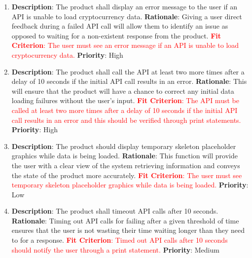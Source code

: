 \documentclass[12pt, titlepage]{article}
\begin{document}
\begin{enumerate}[label = FR-\arabic*, left=\parindent, series=fr]
    \item \textbf{Description}: The product shall display an error message to the user if an API is unable to load cryptocurrency data.
    \newline \textbf{Rationale}: Giving a user direct feedback during a failed API call will allow them to identify an issue as opposed to waiting for a non-existent response from the product. 
    \newline \textcolor{red} {\textbf{Fit Criterion}: The user must see an error message if an API is unable to load cryptocurrency data.}
    \newline \textbf{Priority}: High
    
    \item \textbf{Description}: The product shall call the API at least two more times after a delay of 10 seconds if the initial API call results in an error.
    \newline \textbf{Rationale}: This will ensure that the product will have a chance to correct any initial data loading failures without the user's input.
    \newline \textcolor{red} {\textbf{Fit Criterion}: The API must be called at least two more times after a delay of 10 seconds if the initial API call results in an error and this should be verified through print statements.}
    \newline \textbf{Priority}: High
    
    \item \textbf{Description}: The product should display temporary skeleton placeholder graphics while data is being loaded. 
    \newline \textbf{Rationale}: This function will provide the user with a clear view of the system retrieving information and conveys the state of the product more accurately. 
    \newline \textcolor{red} {\textbf{Fit Criterion}: The user must see temporary skeleton placeholder graphics while data is being loaded.}
    \newline \textbf{Priority}: Low
    
    \item \textbf{Description}: The product shall timeout API calls after 10 seconds.
    \newline \textbf{Rationale}: Timing out API calls for failing after a given threshold of time ensures that the user is not wasting their time waiting longer than they need to for a response.
    \newline \textcolor{red} {\textbf{Fit Criterion}: Timed out API calls after 10 seconds should notify the user through a print statement.}
    \newline \textbf{Priority}: Medium
    

\end{enumerate}
\end{document}
